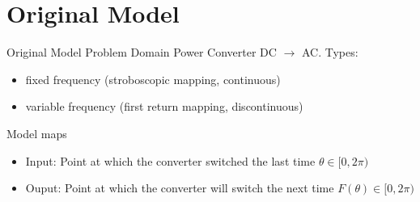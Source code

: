 
\section{Original Model}

\begin{frame}{Original Model Problem Domain}
	Power Converter DC $\to$ AC.
	Types:
	\begin{itemize}
		\item fixed frequency (stroboscopic mapping, continuous)
		\item variable frequency (first return mapping, discontinuous)
		      \hspace{2em}
	\end{itemize}

	\pause
	\vspace{2em}
	Model maps
	\begin{itemize}
		\item Input: Point at which the converter switched the last time $\theta \in [0, 2 \pi)$
		\item Ouput: Point at which the converter will switch the next time $F(\theta) \in [0, 2 \pi)$
	\end{itemize}
\end{frame}


